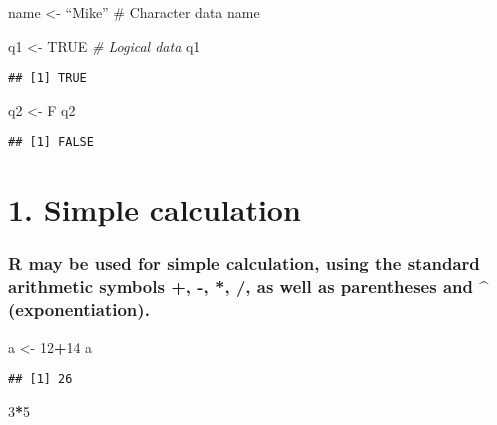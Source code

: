 \documentclass[]{article}
\newenvironment{Shaded}{\begin{snugshade}}{\end{snugshade}}
\newcommand{\DecValTok}[1]{\textcolor[rgb]{0.00,0.00,0.81}{#1}}
\newcommand{\StringTok}[1]{\textcolor[rgb]{0.31,0.60,0.02}{#1}}
\newcommand{\CommentTok}[1]{\textcolor[rgb]{0.56,0.35,0.01}{\textit{#1}}}
\newcommand{\OtherTok}[1]{\textcolor[rgb]{0.56,0.35,0.01}{#1}}
\newcommand{\OperatorTok}[1]{\textcolor[rgb]{0.81,0.36,0.00}{\textbf{#1}}}
\newcommand{\NormalTok}[1]{#1}
\begin{document}
name \textless{}- ``Mike'' \# Character data name

\begin{Shaded}
\begin{Highlighting}[]
\NormalTok{q1 <-}\StringTok{ }\OtherTok{TRUE} \CommentTok{# Logical data}
\NormalTok{q1}
\end{Highlighting}
\end{Shaded}

\begin{verbatim}
## [1] TRUE
\end{verbatim}

\begin{Shaded}
\begin{Highlighting}[]
\NormalTok{q2 <-}\StringTok{ }\NormalTok{F}
\NormalTok{q2}
\end{Highlighting}
\end{Shaded}

\begin{verbatim}
## [1] FALSE
\end{verbatim}

\section{\texorpdfstring{1. \textbf{Simple
calculation}}{1. Simple calculation}}\label{simple-calculation}

\subsubsection{R may be used for simple calculation, using the standard
arithmetic symbols +, -, *, /, as well as parentheses and \^{}
(exponentiation).}\label{r-may-be-used-for-simple-calculation-using-the-standard-arithmetic-symbols---as-well-as-parentheses-and-exponentiation.}

\begin{Shaded}
\begin{Highlighting}[]
\NormalTok{a <-}\StringTok{ }\DecValTok{12}\OperatorTok{+}\DecValTok{14}
\NormalTok{a}
\end{Highlighting}
\end{Shaded}

\begin{verbatim}
## [1] 26
\end{verbatim}

\begin{Shaded}
\begin{Highlighting}[]
\DecValTok{3}\OperatorTok{*}\DecValTok{5}
\end{Highlighting}
\end{Shaded}
\end{document}
